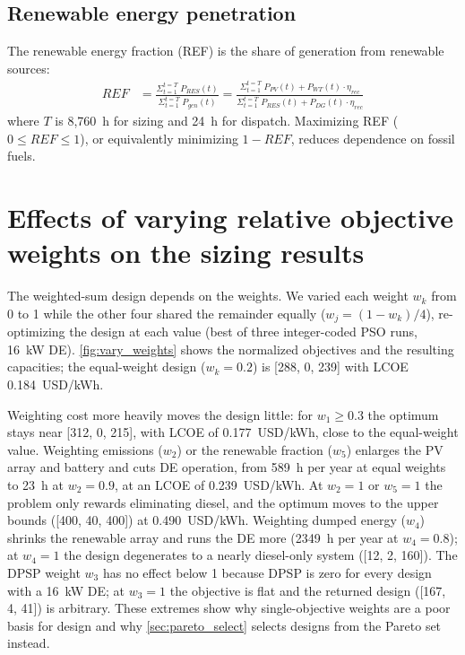 \documentclass[final,3p,times]{elsarticle}
\begin{document}
\subsection{Renewable energy penetration}
The renewable energy fraction (REF) is the share of generation from renewable sources:
\begin{align}
    REF & = \frac{\Sigma_{t=1}^{t=T} \; P_{RES}(t)}{\Sigma_{t=1}^{t=T} \; P_{gen}(t)} = \frac{\Sigma_{t=1}^{t=T} \; P_{PV}(t) + P_{WT}(t) \cdot \eta_{rec}}{\Sigma_{t=1}^{t=T} \; P_{RES}(t) + P_{DG}(t) \cdot \eta_{rec}}
\end{align}
where $T$ is 8,760~h for sizing and 24~h for dispatch. Maximizing REF ($0 \leq REF \leq 1$), or equivalently minimizing $1-REF$, reduces dependence on fossil fuels.

\section{Effects of varying relative objective weights on the sizing results \label{app:weights}}

The weighted-sum design depends on the weights. We varied each weight $w_k$ from 0 to 1 while the other four shared the remainder equally ($w_j = (1-w_k)/4$), re-optimizing the design at each value (best of three integer-coded PSO runs, 16~kW DE). \cref{fig:vary_weights} shows the normalized objectives and the resulting capacities; the equal-weight design ($w_k = 0.2$) is [288, 0, 239] with LCOE 0.184~USD/kWh.

Weighting cost more heavily moves the design little: for $w_1 \geq 0.3$ the optimum stays near [312, 0, 215], with LCOE of 0.177~USD/kWh, close to the equal-weight value. Weighting emissions ($w_2$) or the renewable fraction ($w_5$) enlarges the PV array and battery and cuts DE operation, from 589~h per year at equal weights to 23~h at $w_2 = 0.9$, at an LCOE of 0.239~USD/kWh. At $w_2 = 1$ or $w_5 = 1$ the problem only rewards eliminating diesel, and the optimum moves to the upper bounds ([400, 40, 400]) at 0.490~USD/kWh. Weighting dumped energy ($w_4$) shrinks the renewable array and runs the DE more (2349~h per year at $w_4 = 0.8$); at $w_4 = 1$ the design degenerates to a nearly diesel-only system ([12, 2, 160]). The DPSP weight $w_3$ has no effect below 1 because DPSP is zero for every design with a 16~kW DE; at $w_3 = 1$ the objective is flat and the returned design ([167, 4, 41]) is arbitrary. These extremes show why single-objective weights are a poor basis for design and why \cref{sec:pareto_select} selects designs from the Pareto set instead.
\end{document}
